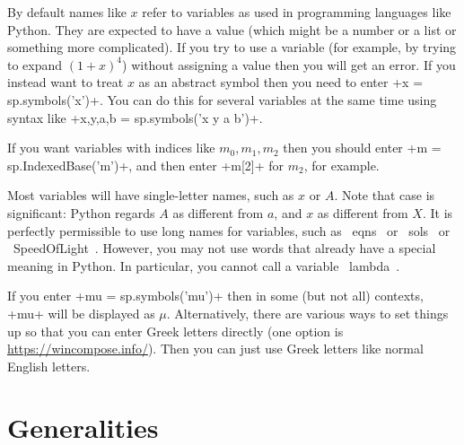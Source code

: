 \documentclass[a4paper,10pt]{amsbook}
\begin{document}
\begin{secenum}
 \item\label{symbols} By default names like $x$ refer to variables as used
  in programming languages like Python.  They are expected to have a
  value (which might be a number or a list or something more
  complicated).  If you try to use a variable (for example, by trying
  to expand $(1+x)^4$) without assigning a value  then you will get an
  error.  If you instead want to treat $x$ as an abstract symbol 
  then you need to enter \pcode+x = sp.symbols('x')+.  You can do this for 
  several variables at the same time using syntax like 
  \pcode+x,y,a,b = sp.symbols('x y a b')+.  
%
 \item\label{subscripts} If you want variables 
  with indices like $m_0,m_1,m_2$ then you should enter 
  \pcode+m = sp.IndexedBase('m')+, and then enter \pcode+m[2]+ for
  $m_2$, for example.
%
 \item\label{variables} Most variables will have single-letter
  names, such as $x$ or $A$.   Note that case is significant:
  Python regards $A$ as different from $a$, and $x$ as different
  from $X$.  It is perfectly permissible to use long
  names for variables, such as \pcode~eqns~ or \pcode~sols~ or
  \pcode~SpeedOfLight~.  However, you may not use words that
  already have a special meaning in Python.  In particular,
  you cannot call a variable \pcode~lambda~. 
%
  \item\label{greek} If you enter \pcode+mu = sp.symbols('mu')+ then in some
  (but not all) contexts, \pcode+mu+ will be displayed as $\mu$.
   Alternatively, there are various ways to set things up so that you
   can enter Greek letters directly (one option is 
   \href{Wincompose}{https://wincompose.info/}).  Then you can just 
   use Greek letters like normal English letters.
\end{secenum}

\section{Generalities}
\end{document}
